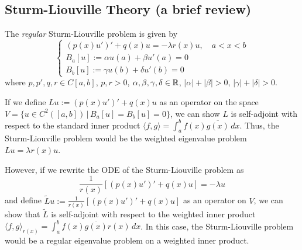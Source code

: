 \subsection*{Sturm-Liouville Theory \small{(a brief review)}}
\label{SturmLiouville}

The \emph{regular} Sturm-Liouville problem is given by
\[
\left\{
\begin{array}{l}
(p(x)u')' + q(x)u = -\lambda r(x) u,  \quad a < x < b \\
B_a[u] := \alpha u(a) + \beta u'(a) = 0 \\
B_b[u] := \gamma u(b) + \delta u'(b) = 0
\end{array}
\right.
\]
where $p,p',q,r \in C[a,b]$, $p,r > 0$, $\alpha, \beta, \gamma, \delta \in \mathbb{R}$, $|\alpha|+|\beta| > 0$, $|\gamma| + |\delta| > 0$.

If we define $Lu := (p(x)u')' + q(x) u$ as an operator on the space $V = \{ u \in C^2([a,b]) \, | \, B_a[u] = B_b[u] = 0 \}$, we can show $L$ is self-adjoint with respect to the standard inner product $\langle f,g \rangle = \int_a^b f(x)\overline{g(x)} \, dx$. Thus, the Sturm-Liouville problem would be the weighted eigenvalue problem $Lu = \lambda r(x) u$.

However, if we rewrite the ODE of the Sturm-Liouville problem as
\[
\frac{1}{r(x)}\left[ (p(x)u')' + q(x)u \right]= -\lambda u
\]
and define $\tilde{L}u := \frac{1}{r(x)}\left[ (p(x)u')' + q(x)u \right]$ as an operator on $V$, we can show that $\tilde{L}$ is self-adjoint with respect to the weighted inner product $\langle f,g \rangle_{r(x)} = \int_a^b f(x) \overline{g(x)} r(x) \, dx$. In this case, the Sturm-Liouville problem would be a regular eigenvalue problem on a weighted inner product.

